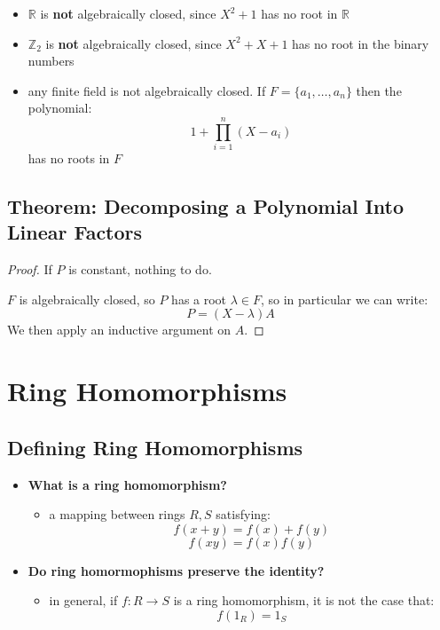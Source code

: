 \documentclass{exam}
\begin{document}
\begin{itemize}
    \item $\mathbb{R}$ is \textbf{not} algebraically closed, since $X^2 + 1$ has no root in $\mathbb{R}$
    \item $\mathbb{Z}_2$ is \textbf{not} algebraically closed, since $X^2 + X + 1$ has no root in the binary numbers
    \item any finite field is not algebraically closed. If $F = \{a_1, \ldots, a_n\}$ then the polynomial:
    \[
    1 + \prod_{i = 1}^n (X - a_i)
    \]
    has no roots in $F$
\end{itemize}

\subsection{Theorem: Decomposing a Polynomial Into Linear Factors}


\begin{proof}

If $P$ is constant, nothing to do.

\bigskip

$F$ is algebraically closed, so $P$ has a root $\lambda \in F$, so in particular we can write:
\[
P = (X - \lambda)A
\]
We then apply an inductive argument on $A$.

\end{proof}

\section{Ring Homomorphisms}

\subsection{Defining Ring Homomorphisms}

\begin{itemize}
    \item \textbf{What is a ring homomorphism?}
    \begin{itemize}
        \item a mapping between rings $R,S$ satisfying:
        \[
        f(x + y) = f(x) + f(y)
        \]
        \[
        f(xy) = f(x)f(y)
        \]
    \end{itemize}
    \item \textbf{Do ring homormophisms preserve the identity?}
    \begin{itemize}
        \item in general, if $f : R \to S$ is a ring homomorphism, it is not the case that:
        \[
        f(1_R) = 1_S
        \]
    \end{itemize}
\end{itemize}
\end{document}
